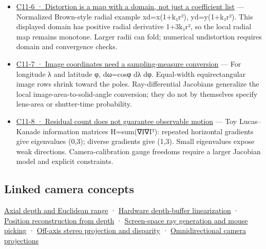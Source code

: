 \begin{itemize}
\item
  \href{Continuous\%20Notes/Computing\%20Foundations\%20-\%20From\%20Bits\%20to\%20C++\%20and\%20Systems\%20APIs\#Figure\%20C11-6\%20—\%20Distortion\%20is\%20a\%20map\%20with\%20a\%20domain,\%20not\%20just\%20a\%20coefficient\%20list}{C11-6 · Distortion is a map with a domain, not just a coefficient list} --- Normalized Brown-style radial example xd=x(1+k₁r²), yd=y(1+k₁r²). This displayed domain has positive radial derivative 1+3k₁r², so the local radial map remains monotone. Larger radii can fold; numerical undistortion requires domain and convergence checks.
\item
  \href{Continuous\%20Notes/Computing\%20Foundations\%20-\%20From\%20Bits\%20to\%20C++\%20and\%20Systems\%20APIs\#Figure\%20C11-7\%20—\%20Image\%20coordinates\%20need\%20a\%20sampling-measure\%20conversion}{C11-7 · Image coordinates need a sampling-measure conversion} --- For longitude λ and latitude φ, dω=cosφ dλ dφ. Equal-width equirectangular image rows shrink toward the poles. Ray-differential Jacobians generalize the local image-area-to-solid-angle conversion; they do not by themselves specify lens-area or shutter-time probability.
\item
  \href{Continuous\%20Notes/Computing\%20Foundations\%20-\%20From\%20Bits\%20to\%20C++\%20and\%20Systems\%20APIs\#Figure\%20C11-8\%20—\%20Residual\%20count\%20does\%20not\%20guarantee\%20observable\%20motion}{C11-8 · Residual count does not guarantee observable motion} --- Toy Lucas--Kanade information matrices H=sum(∇I∇Iᵀ): repeated horizontal gradients give eigenvalues (0,3); diverse gradients give (1,3). Small eigenvalues expose weak directions. Camera-calibration gauge freedoms require a larger Jacobian model and explicit constraints.
\end{itemize}

\subsection{Linked camera concepts}\label{linked-camera-concepts}

\hyperref[appendix-cac01ebeeb11]{Axial depth and Euclidean range} · \hyperref[appendix-1bc40b08db4a]{Hardware depth-buffer linearization} · \hyperref[appendix-2cbf2968e866]{Position reconstruction from depth} · \hyperref[appendix-f1a6d43e80d1]{Screen-space ray generation and mouse picking} · \hyperref[appendix-0976e86e5b9f]{Off-axis stereo projection and disparity} · \hyperref[appendix-fc99ad39f351]{Omnidirectional camera projections}

